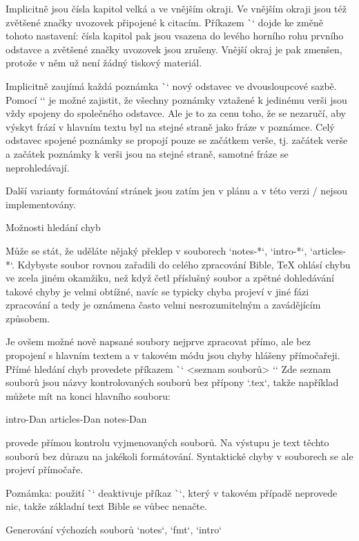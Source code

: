 Implicitně jsou čísla kapitol velká a ve vnějším okraji. Ve vnějším okraji jsou též
zvětšené značky uvozovek připojené k citacím. Příkazem \`\normalchapnumbers`
dojde ke změně tohoto nastavení: čísla kapitol pak jsou vsazena do levého
horního rohu prvního odstavce a zvětšené značky uvozovek jsou zrušeny.
Vnější okraj je pak zmenšen, protože v něm už není žádný tiskový materiál.  

Implicitně zaujímá každá poznámka \`\Note` nový odstavec ve dvousloupcové
sazbě. Pomocí `\mergednotes` je možné zajistit, že všechny poznámky vztažené
k jedinému verši jsou vždy spojeny do společného odstavce. Ale je to za cenu
toho, že se nezaručí, aby výskyt frází v hlavním textu byl na stejné straně
jako fráze v poznámce. Celý odstavec spojené poznámky se propojí pouze se
začátkem verše, tj. začátek verše a začátek poznámky k verši jsou na stejné
straně, samotné fráze se neprohledávají.

Další varianty formátování stránek jsou zatím jen v plánu a v této verzi \OpBible/ nejsou
implementovány.


\sec Možnosti hledání chyb

Může se stát, že uděláte nějaký překlep v souborech `notes-*`, `intro-*`,
`articles-*`. Kdybyste soubor rovnou zařadili do celého zpracování Bible,
TeX ohlásí chybu ve zcela jiném okamžiku, než když četl příslušný soubor a
zpětné dohledávání takové chyby je velmi obtížné, navíc se typicky chyba
projeví v jiné fázi zpracování a tedy je oznámena často velmi
nesrozumitelným a zavádějícím způsobem.

Je ovšem možné nově napsané soubory nejprve zpracovat přímo, ale bez
propojení s hlavním textem a v takovém módu jsou chyby hlášeny přímočařeji.
Přímé hledání chyb provedete příkazem \`\checksyntax` <seznam souborů> `{}`
Zde seznam souborů jsou názvy kontrolovaných souborů bez přípony `.tex`,
takže například můžete mít na konci hlavního souboru:

\begtt
\checksyntax intro-Dan articles-Dan notes-Dan {}
\endtt

provede přímou kontrolu vyjmenovaných souborů. Na výstupu je text těchto
souborů bez důrazu na jakékoli formátování. Syntaktické chyby v souborech se
ale projeví přímočaře.

Poznámka: použití \`\checksyntax` deaktivuje příkaz \`\processbooks`, který v
takovém případě neprovede nic, takže základní text Bible se vůbec nenačte.


\sec Generování výchozích souborů `notes`, `fmt`, `intro`

